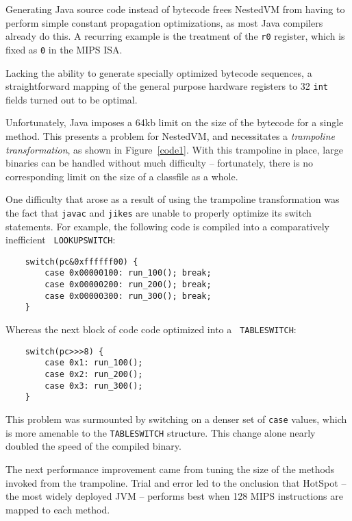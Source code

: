 \documentclass{acmconf}
\begin{document}
Generating Java source code instead of bytecode frees NestedVM from
having to perform simple constant propagation optimizations, as most
Java compilers already do this.  A recurring example is the treatment
of the {\tt r0} register, which is fixed as {\tt 0} in the MIPS ISA.

Lacking the ability to generate specially optimized bytecode
sequences, a straightforward mapping of the general purpose hardware
registers to 32 {\tt int} fields turned out to be optimal.



Unfortunately, Java imposes a 64kb limit on the size of the bytecode
for a single method.  This presents a problem for NestedVM, and
necessitates a {\it trampoline transformation}, as shown in
Figure~\ref{code1}.  With this trampoline in place, large binaries can
be handled without much difficulty -- fortunately, there is no
corresponding limit on the size of a classfile as a whole.

One difficulty that arose as a result of using the trampoline
transformation was the fact that {\tt javac} and {\tt jikes} are
unable to properly optimize its switch statements.  For example, the
following code is compiled into a comparatively inefficient {\tt
LOOKUPSWITCH}:

{\footnotesize
\begin{verbatim}
    switch(pc&0xffffff00) {
        case 0x00000100: run_100(); break;
        case 0x00000200: run_200(); break;
        case 0x00000300: run_300(); break;
    }
\end{verbatim}}

Whereas the next block of code code optimized into a {\tt
TABLESWITCH}:

{\footnotesize
\begin{verbatim}
    switch(pc>>>8) {
        case 0x1: run_100();
        case 0x2: run_200();
        case 0x3: run_300();
    }
\end{verbatim}}

This problem was surmounted by switching on a denser set of {\tt case}
values, which is more amenable to the {\tt TABLESWITCH} structure.
This change alone nearly doubled the speed of the compiled binary.

The next performance improvement came from tuning the size of the
methods invoked from the trampoline.  Trial and error led to the
onclusion that HotSpot \cite{hotspot} -- the most widely deployed JVM
-- performs best when 128 MIPS instructions are mapped to each method.
\end{document}
